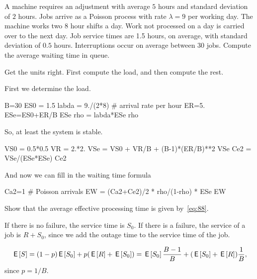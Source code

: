 \begin{exercise}
  A machine requires an adjustment with average $5$ hours and standard deviation of $2$ hours.
  Jobs arrive as a Poisson process with rate $\lambda=9$ per working day.
  The machine works two $8$ hour shifts a day.
  Work not processed on a day is carried over to the next day.
  Job service times are 1.5 hours, on average, with standard deviation of $0.5$ hours.
  Interruptions occur on average between $30$ jobs.
  Compute the average waiting time in queue.
\begin{hint}
  Get the units right. First compute the load, and then compute the rest.
\end{hint}
\begin{solution}
  First we determine the load. 
  \begin{pyconsole}
B=30
ES0 = 1.5
labda = 9./(2*8) # arrival rate per hour
ER=5.
ESe=ES0+ER/B
ESe
rho = labda*ESe
rho
  \end{pyconsole}
So, at least the system is stable.

\begin{pyconsole}
VS0 = 0.5*0.5
VR = 2.*2.
VSe = VS0 + VR/B + (B-1)*(ER/B)**2
VSe
Ce2 = VSe/(ESe*ESe)
Ce2
\end{pyconsole}

And now we can fill in the waiting time formula
\begin{pyconsole}
Ca2=1 # Poisson arrivals
EW = (Ca2+Ce2)/2 * rho/(1-rho) * ESe
EW  
\end{pyconsole}
\end{solution}
\end{exercise}

\begin{exercise}
Show that the average effective processing time is given by~\cref{eq:88}. 
\begin{hint}
If there is no failure, the service time is $S_0$. If there is a failure, the service of a job is $R + S_0$, since we add the outage time to the service time of the job. 
\end{hint}
\begin{solution}
    \begin{equation*}
      \,\mathsf{E}\left[S\right] = (1-p)\,\mathsf{E}\left[S_0\right] + p (\,\mathsf{E}\left[R\right] + \,\mathsf{E}\left[S_0\right]) = \,\mathsf{E}\left[S_0\right] \frac{B-1}B + (\,\mathsf{E}\left[S_0\right] + \,\mathsf{E}\left[R\right]) \frac 1B,
    \end{equation*}
since $p=1/B$. 
\end{solution}
\end{exercise}


